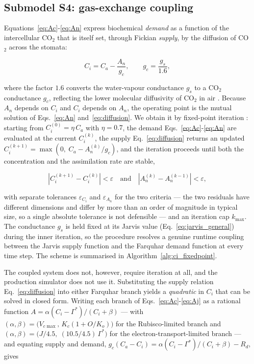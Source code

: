 \documentclass[a4paper,fleqn]{cas-sc}
\begin{document}
\subsection{Submodel S4: gas-exchange coupling}
\label{sec:closure}

Equations~\eqref{eq:Ac}-\eqref{eq:An} express biochemical
\emph{demand} as a function of the intercellular CO$_2$ that is itself set,
through Fickian \emph{supply}, by the diffusion of CO$_2$ across the
stomata:

\begin{equation}
C_i = C_a - \frac{A_n}{g_c},
\qquad
g_c = \frac{g_s}{1.6},
\label{eq:diffusion}
\end{equation}

where the factor $1.6$ converts the water-vapour conductance $g_s$ to a
CO$_2$ conductance $g_c$, reflecting the lower molecular diffusivity of
CO$_2$ in air \citep{vonCaemmerer2000,Nobel2009}. Because $A_n$ depends on
$C_i$ and $C_i$ depends on $A_n$, the operating point is the mutual
solution of Eqs.~\eqref{eq:An} and~\eqref{eq:diffusion}. We obtain it by
fixed-point iteration \citep{Press2007}: starting from
$C_i^{(0)}=\eta\,C_a$ with $\eta=0.7$, the demand
Eqs.~\eqref{eq:Ac}-\eqref{eq:An} are evaluated at the current $C_i^{(k)}$,
the supply Eq.~\eqref{eq:diffusion} returns an updated
$C_i^{(k+1)}=\max\!\left(0,\;C_a - A_n^{(k)}/g_c\right)$, and the iteration
proceeds until both the concentration and the assimilation rate are
stable,

\begin{equation}
\left|C_i^{(k+1)} - C_i^{(k)}\right| < \varepsilon
\quad\text{and}\quad
\left|A_n^{(k)} - A_n^{(k-1)}\right| < \varepsilon,
\label{eq:convergence}
\end{equation}

with separate tolerances $\varepsilon_{C_i}$ and $\varepsilon_{A_n}$ for the
two criteria --- the two residuals have different dimensions and differ by
more than an order of magnitude in typical size, so a single absolute
tolerance is not defensible --- and an iteration cap $k_{\max}$. The
conductance $g_s$ is held fixed at its Jarvis value
(Eq.~\eqref{eq:jarvis_general}) during the inner iteration, so the
procedure resolves a genuine runtime coupling between the Jarvis supply
function and the Farquhar demand function at every time step. The scheme is
summarised in Algorithm~\ref{alg:ci_fixedpoint}.

The coupled system does not, however, require iteration at all, and the
production simulator does not use it. Substituting the supply relation
Eq.~\eqref{eq:diffusion} into either Farquhar branch yields a
\emph{quadratic} in $C_i$ that can be solved in closed form. Writing each
branch of Eqs.~\eqref{eq:Ac}-\eqref{eq:Aj} as a rational function
$A = \alpha(C_i-\Gamma^{*})/(C_i + \beta)$ --- with
$(\alpha,\beta) = \bigl(V_{c\max},\,K_c(1+O/K_o)\bigr)$ for the
Rubisco-limited branch and
$(\alpha,\beta) = \bigl(J/4.5,\;(10.5/4.5)\,\Gamma^{*}\bigr)$ for the
electron-transport-limited branch --- and equating supply and demand,
$g_c(C_a - C_i) = \alpha(C_i-\Gamma^{*})/(C_i+\beta) - R_d$, gives
\end{document}
